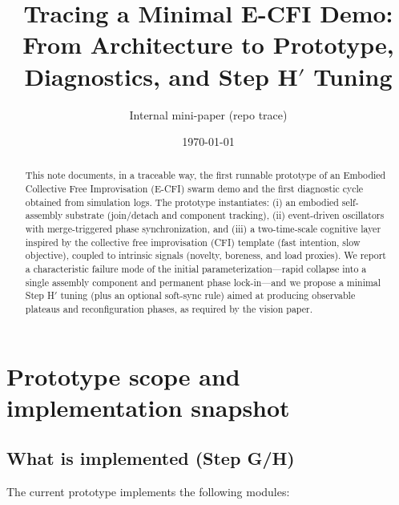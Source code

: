 \documentclass[11pt]{article}
\title{Tracing a Minimal E-CFI Demo: From Architecture to Prototype, Diagnostics, and Step H$'$ Tuning}
\author{Internal mini-paper (repo trace)}
\date{\today}
\begin{document}
\maketitle

\begin{abstract}
This note documents, in a traceable way, the first runnable prototype of an Embodied Collective Free Improvisation (E-CFI)
swarm demo and the first diagnostic cycle obtained from simulation logs.
The prototype instantiates: (i) an embodied self-assembly substrate (join/detach and component tracking), (ii) event-driven oscillators
with merge-triggered phase synchronization, and (iii) a two-time-scale cognitive layer inspired by the collective free improvisation (CFI)
template (fast intention, slow objective), coupled to intrinsic signals (novelty, boreness, and load proxies).
We report a characteristic failure mode of the initial parameterization---rapid collapse into a single assembly component and permanent
phase lock-in---and we propose a minimal Step H$'$ tuning (plus an optional soft-sync rule) aimed at producing observable plateaus and
reconfiguration phases, as required by the vision paper.
\end{abstract}

\section{Prototype scope and implementation snapshot}
\subsection{What is implemented (Step G/H)}
The current prototype implements the following modules:
\end{document}
